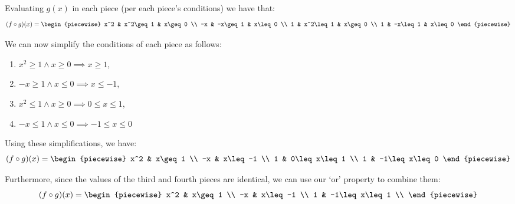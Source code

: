 \begin{example}
    Evaluating $g(x)$ in each piece (per each piece's conditions) we have that:
    $$
        (f\circ g)(x)=\begin{piecewise}
            x^2 & x^2\geq 1 & x\geq 0 \\
            -x & -x\geq 1 & x\leq 0 \\
            1 & x^2\leq 1 & x\geq 0 \\
            1 & -x\leq 1 & x\leq 0
        \end{piecewise}
    $$

    We can now simplify the conditions of each piece as follows:
    \begin{enumerate}
        \item $x^2\geq 1\land x\geq 0\implies x\geq 1$,
        \item $-x\geq 1\land x\leq 0\implies x\leq -1$,
        \item $x^2\leq 1\land x\geq 0\implies 0\leq x\leq 1$,
        \item $-x\leq 1\land x\leq 0\implies -1\leq x\leq 0$
    \end{enumerate}

    Using these simplifications, we have:
    $$
        (f\circ g)(x)=\begin{piecewise}
            x^2 & x\geq 1 \\
            -x & x\leq -1 \\
            1 & 0\leq x\leq 1 \\
            1 & -1\leq x\leq 0
        \end{piecewise}
    $$

    Furthermore, since the values of the third and fourth pieces are identical, we can use our `or' property to combine them:
    $$
        (f\circ g)(x)=\begin{piecewise}
            x^2 & x\geq 1 \\
            -x & x\leq -1 \\
            1 & -1\leq x\leq 1 \\
        \end{piecewise}
    $$
\end{example}
\newpage